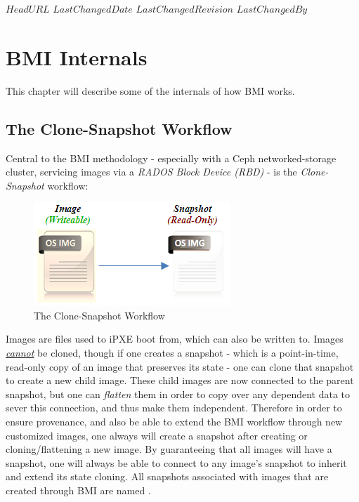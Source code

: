 \svnidlong
{$HeadURL$}
{$LastChangedDate$}
{$LastChangedRevision$}
{$LastChangedBy$}

\chapter{BMI Internals}

\begin{introduction}
  This chapter will describe some of the internals of how BMI works.
\end{introduction}


\section{The Clone-Snapshot Workflow}

Central to the BMI methodology - especially with a Ceph networked-storage cluster, servicing images via a \emph{RADOS Block Device (RBD)} - is the \emph{Clone-Snapshot} workflow: \\

\begin{figure}[!h] %
\label{fig:bmi-workflow-import}
\begin{center}
\includegraphics[scale=1]{figures/ceph-clone-snapshot.png}
\end{center}
\caption{The Clone-Snapshot Workflow}
\end{figure}


Images are files used to iPXE boot from, which can also be written to.  Images \underline{\emph{cannot}} be cloned, though if one creates a snapshot - which is a point-in-time, read-only copy of an image that preserves its state - one can clone that snapshot to create a new child image.  These child images are now connected to the parent snapshot, but one can \emph{flatten} them in order to copy over any dependent data to sever this connection, and thus make them independent. Therefore in order to ensure provenance, and also be able to extend the BMI workflow through new customized images, one always will create a snapshot after creating or cloning/flattening a new image.  By guaranteeing that all images will have a snapshot, one will always be able to connect to any image's snapshot to inherit and extend its state cloning.  All snapshots associated with images that are created through BMI are named . \\


